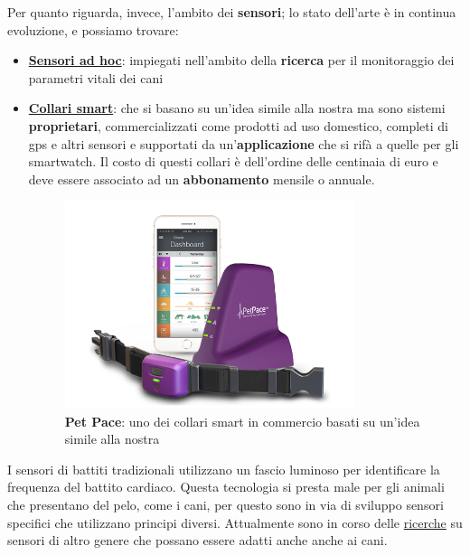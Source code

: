 Per quanto riguarda, invece, l'ambito dei \textbf{sensori}; lo stato dell'arte è in continua evoluzione, e possiamo trovare:
\begin{itemize}
    \item \textbf{\href{https://ciigar.csc.ncsu.edu/files/bib/Brugarolas2015-DogHeartMonitor.pdf}{Sensori ad hoc}}: impiegati nell'ambito della \textbf{ricerca} per il monitoraggio dei parametri vitali dei cani
    \item \textbf{\href{https://petpace.com/}{Collari smart}}: che si basano su un'idea simile alla nostra ma sono sistemi \textbf{proprietari}, commercializzati come prodotti ad uso domestico, completi di gps e altri sensori e supportati da un'\textbf{applicazione} che si rifà a quelle per gli smartwatch. Il costo di questi collari è dell'ordine delle centinaia di euro e deve essere associato ad un \textbf{abbonamento} mensile o annuale. 
    
    \begin{figure}[H]
       
        \label{fig:PetPace}
        \centering
        \includegraphics[width=0.8\textwidth]{Images/petpace.png}
         \caption{\textbf{Pet Pace}: uno dei collari smart in commercio basati su un'idea simile alla nostra}
    \end{figure}
\end{itemize}



I sensori di battiti tradizionali utilizzano un fascio luminoso per identificare la frequenza del battito cardiaco. Questa tecnologia si presta male per gli animali che presentano del pelo, come i cani, per questo sono in via di sviluppo sensori specifici che utilizzano principi diversi. Attualmente sono in corso delle
\href{https://vcs.vetmed.wsu.edu/research/clinical-studies/clinincal-studies-detail/vcs-clinical-studies/2017/06/28/new-ecg-technology}{ricerche} su sensori di altro genere che possano essere adatti anche anche ai cani.

